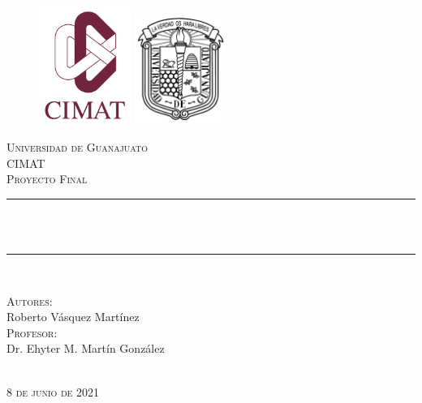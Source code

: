 \documentclass[12pt, letterpaper]{article}
\author{Roberto Vásquez Martínez}
\numberwithin{equation}{section}
\begin{document}
\begin{titlepage}
	\centering
    \vspace*{0.0 cm}
    \begin{figure}[h!]\centering
        \begin{minipage}{0.4\textwidth}
            \includegraphics[width= 3cm]{logo_Cimat.png}            
        \end{minipage}\hfill
        \begin{minipage}{0.20\textwidth}
            \includegraphics[width= 3cm]{logoUG.png}
        \end{minipage}
    \end{figure}
    \textsc{\LARGE Universidad de Guanajuato}\\[0.3 cm]
    \textsc{\LARGE CIMAT}\\[2.0 cm]	%
	\textsc{\Large Proyecto Final}\\[0.5 cm]
    {\color{coolred}
	\rule{\linewidth}{0.2 mm}} \\[0.4 cm]
	{ \huge \bfseries \color{mytitlecolor}{Teorema de Donsker}}\\
    {\color{coolred}
	\rule{\linewidth}{0.2 mm}} \\[1.5 cm]
	
	\begin{minipage}{0.4\textwidth}
		\begin{center} \large
			\textsc{Autores:}\\[0.25 cm]
			Roberto Vásquez Martínez\\ [1.0 cm]
			\textsc{Profesor:}\\[0.25 cm]
			Dr. Ehyter M. Martín González
			\end{center}
	\end{minipage}\\[2 cm]
	{\normalsize \textsc{8 de junio de 2021}
    }\\[2 cm]
	\vfill
\end{titlepage}
\end{document}
